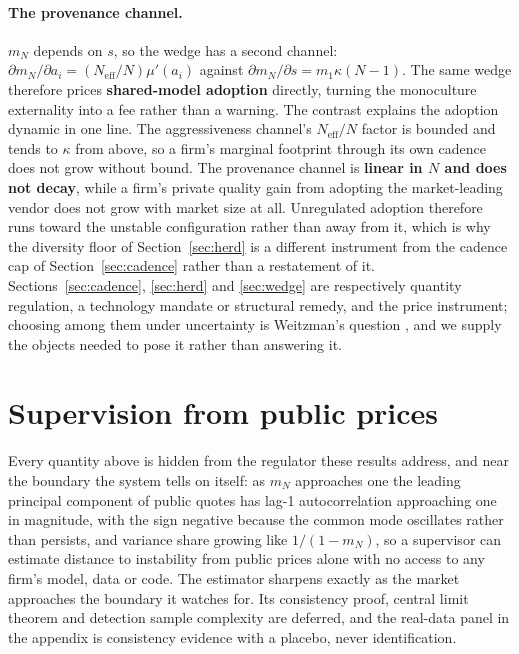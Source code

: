 \documentclass{article}
\theoremstyle{plain}
\theoremstyle{definition}
\newcommand{\Neff}{N_{\mathrm{eff}}}
\newcommand{\mN}{m_N}
\begin{document}
\paragraph{The provenance channel.}
$\mN$ depends on $s$, so the wedge has a second channel: $\partial\mN/\partial a_i = (\Neff/N)\mu'(a_i)$ against $\partial \mN/\partial s = m_1\kappa(N-1)$. The same wedge therefore prices \textbf{shared-model adoption} directly, turning the monoculture externality into a fee rather than a warning. The contrast explains the adoption dynamic in one line. The aggressiveness channel's $\Neff/N$ factor is bounded and tends to $\kappa$ from above, so a firm's marginal footprint through its own cadence does not grow without bound. The provenance channel is \textbf{linear in $N$ and does not decay}, while a firm's private quality gain from adopting the market-leading vendor does not grow with market size at all. Unregulated adoption therefore runs toward the unstable configuration rather than away from it, which is why the diversity floor of Section~\ref{sec:herd} is a different instrument from the cadence cap of Section~\ref{sec:cadence} rather than a restatement of it. Sections~\ref{sec:cadence}, \ref{sec:herd} and \ref{sec:wedge} are respectively quantity regulation, a technology mandate or structural remedy, and the price instrument; choosing among them under uncertainty is Weitzman's question \citep{weitzman1974}, and we supply the objects needed to pose it rather than answering it.

\section{Supervision from public prices}
\label{sec:supervision}

Every quantity above is hidden from the regulator these results address, and near the boundary the system tells on itself: as $\mN$ approaches one the leading principal component of public quotes has lag-1 autocorrelation approaching one in magnitude, with the sign negative because the common mode oscillates rather than persists, and variance share growing like $1/(1-\mN)$, so a supervisor can estimate distance to instability from public prices alone with no access to any firm's model, data or code. The estimator sharpens exactly as the market approaches the boundary it watches for. Its consistency proof, central limit theorem and detection sample complexity are deferred, and the real-data panel in the appendix is consistency evidence with a placebo, never identification.
\end{document}

